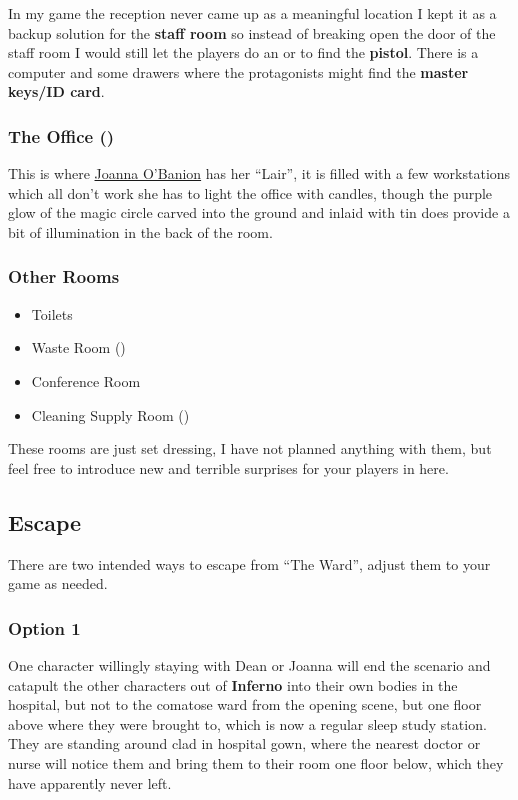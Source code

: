 In my game the reception never came up as a meaningful location I kept it as a backup solution for the \textbf{staff room} so
instead of breaking open the door of the staff room I would still let the players do an 
or  to find the \textbf{pistol}.  There is a computer and some drawers where the protagonists might
find the \textbf{master keys/ID card}.

\subsubsection{The Office (\faLock)}%
\label{ssub:the_office}

This is where \hyperref[ssub:joanna_o_banion]{Joanna O'Banion} has her “Lair”, it is filled with a few workstations which all
don't work she has to light the office with candles, though the purple glow of the magic circle carved into the ground and
inlaid with tin does provide a bit of illumination in the back of the room.


\subsubsection{Other Rooms}%
\label{ssub:other_rooms}

\begin{itemize}[noitemsep]
  \item Toilets
  \item Waste Room (\faLock)
  \item Conference Room
  \item Cleaning Supply Room (\faLock)
\end{itemize}

These rooms are just set dressing, I have not planned anything with them, but feel free to introduce new and terrible surprises
for your players in here.

\subsection{Escape}%
\label{sub:escape}

There are two intended ways to escape from “The Ward”, adjust them to your game as needed.

\subsubsection{Option 1}%
\label{ssub:escape_option1}
One character willingly staying with Dean or Joanna will end the scenario and catapult the other characters out of
\textbf{Inferno} into their own bodies in the hospital, but not to the comatose ward from the opening scene, but one floor
above where they were brought to, which is now a regular sleep study station.  They are standing around clad in hospital gown,
where the nearest doctor or nurse will notice them and bring them to their room one floor below, which they have apparently
never left.

